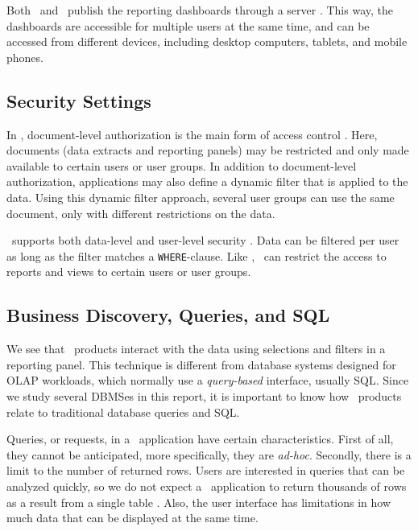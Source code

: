 Both \qlikview~and \tableau~publish the reporting dashboards through a server \cite{Kamkolkar2015-iq, Qlik2011-ef}. This way, the dashboards are accessible for multiple users at the same time, and can be accessed from different devices, including desktop computers, tablets, and mobile phones.

\subsection{Security Settings}
\label{sub:Security Settings}
In \qlikview, document-level authorization is the main form of access control \cite{Qlik2011-hj}. Here, documents (data extracts and reporting panels) may be restricted and only made available to certain users or user groups. In addition to document-level authorization, applications may also define a dynamic filter that is applied to the data. Using this dynamic filter approach, several user groups can use the same document, only with different restrictions on the data.

\tableau~supports both data-level and user-level security \cite{Kamkolkar2015-iq}. Data can be filtered per user as long as the filter matches a \texttt{WHERE}-clause. Like \qlikview, \tableau~can restrict the access to reports and views to certain users or user groups.

\subsection{Business Discovery, Queries, and SQL}
\label{sub:Business Discovery, Queries, and SQL}
We see that \bd~products interact with the data using selections and filters in a reporting panel. This technique is different from database systems designed for OLAP workloads, which normally use a \textit{query-based} interface, usually SQL. Since we study several DBMSes in this report, it is important to know how \bd~products relate to traditional database queries and SQL.

Queries, or requests, in a \bd~application have certain characteristics. First of all, they cannot be anticipated, more specifically, they are \textit{ad-hoc}. Secondly, there is a limit to the number of returned rows. Users are interested in queries that can be analyzed quickly, so we do not expect a \bd~application to return thousands of rows as a result from a single table \cite{Ferrari2012-hm}. Also, the user interface has limitations in how much data that can be displayed at the same time. 

